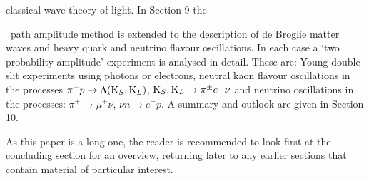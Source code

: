 \documentclass [12pt]{article}
\begin{document}
   classical wave theory of light. In Section 9 the{\ path amplitude method is extended to the
    description of de Broglie matter waves and heavy quark and neutrino flavour oscillations.
    In each case a `two probability amplitude' experiment is analysed in detail. These are:
    Young double slit experiments using photons or electrons, neutral kaon flavour oscillations
   in the processes $\pi^- p \rightarrow \Lambda ({\rm K}_S,{\rm K}_L)$, ${\rm K}_S,{\rm K}_L
    \rightarrow \pi^{\pm} e^{\mp} \nu$ and neutrino oscillations in the processes:
    $\pi^+ \rightarrow \mu^+ \nu$, $\nu n \rightarrow e^- p$.
    A summary and outlook are given in Section 10.
    \par As this paper is a long one, the reader is recommended to look first at the concluding
     section for an overview, returning later to any earlier sections that contain material of
     particular interest.

}
\end{document}
